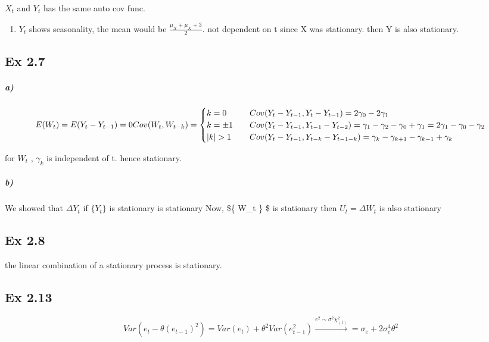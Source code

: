 \documentclass[
]{article}
\providecommand{\tightlist}{%
  \setlength{\itemsep}{0pt}\setlength{\parskip}{0pt}}
\begin{document}
\(X_t\) and \(Y_t\) has the same auto cov func.

\begin{enumerate}
\def\labelenumi{\alph{enumi})}
\setcounter{enumi}{1}
\tightlist
\item
  \(Y_t\) shows seasonality, the mean would be
  \(\frac{\mu_X + \mu_X + 3}{2}\). not dependent on t since X was
  stationary. then Y is also stationary.
\end{enumerate}

\subsection{Ex 2.7}\label{ex-2.7}

\subparagraph{a)}\label{a}

\[
E(W_t) = E(Y_t - Y_{t-1}) = 0  \\
Cov(W_t, W_{t-k}) = 
\begin{cases}
k = 0 & \quad Cov(Y_t - Y_{t-1}, Y_t - Y_{t-1}) = 2\gamma_0 - 2\gamma_1 \\
k = \pm 1 & \quad Cov(Y_t - Y_{t-1}, Y_{t-1} - Y_{t-2}) = \gamma_1 - \gamma_2 - \gamma_0 + \gamma_1 = 2\gamma_1 - \gamma_0 - \gamma_2 \\
|k| > 1 & \quad Cov(Y_t - Y_{t-1}, Y_{t-k} - Y_{t-1-k}) = \gamma_k -\gamma_{k+1} -\gamma_{k-1} + \gamma_k 
\end{cases}
\]

for \(W_t\) , \(\gamma_k\) is independent of t. hence stationary.

\subparagraph{b)}\label{b}

We showed that \(\Delta Y_t\) if \(\{ Y_t \}\) is stationary is
stationary Now, \$\{ W\_t \} \$ is stationary then \(U_t = \Delta W_t\)
is also stationary

\subsection{Ex 2.8}\label{ex-2.8}

the linear combination of a stationary process is stationary.

\subsection{Ex 2.13}\label{ex-2.13}

\[
Var(e_t - \theta (e_{t-1})^2) = Var(e_t) + \theta^2Var(e_{t-1}^2 ) \xrightarrow{e^2 \sim \sigma^2 \chi^2_{(1)}} = \sigma_e + 2\sigma^4_e\theta^2
\]
\end{document}
